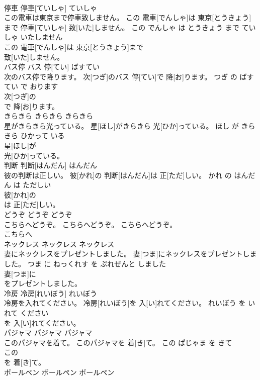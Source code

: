 \documentclass[8pt]{extreport}
\begin{document}
\begin{CJK}{UTF8}{min}
\\	停車	停車[ていしゃ]	ていしゃ	
\\	この電車は東京まで停車致しません。	この 電車[でんしゃ]は 東京[とうきょう]まで 停車[ていしゃ] 致[いた]しません。	この でんしゃ は とうきょう まで ていしゃ いたしません	
\\	この 電車[でんしゃ]は 東京[とうきょう]まで
\\	致[いた]しません。			
\\	バス停	バス 停[てい]	ばすてい	
\\	次のバス停で降ります。	次[つぎ]のバス 停[てい]で 降[お]ります。	つぎ の ばすてい で おります	
\\	次[つぎ]の
\\	で 降[お]ります。			
\\	きらきら	きらきら	きらきら	
\\	星がきらきら光っている。	星[ほし]がきらきら 光[ひか]っている。	ほし が きらきら ひかって いる	
\\	星[ほし]が
\\	光[ひか]っている。			
\\	判断	判断[はんだん]	はんだん	
\\	彼の判断は正しい。	彼[かれ]の 判断[はんだん]は 正[ただ]しい。	かれ の はんだん は ただしい	
\\	彼[かれ]の
\\	は 正[ただ]しい。			
\\	どうぞ	どうぞ	どうぞ	
\\	こちらへどうぞ。	こちらへどうぞ。	こちらへどうぞ。	
\\	こちらへ
\\	ネックレス	ネックレス	ネックレス	
\\	妻にネックレスをプレゼントしました。	妻[つま]にネックレスをプレゼントしました。	つま に ねっくれす を ぷれぜんと しました	
\\	妻[つま]に
\\	をプレゼントしました。			
\\	冷房	冷房[れいぼう]	れいぼう	
\\	冷房を入れてください。	冷房[れいぼう]を 入[い]れてください。	れいぼう を いれて ください	
\\	を 入[い]れてください。			
\\	パジャマ	パジャマ	パジャマ	
\\	このパジャマを着て。	このパジャマを 着[き]て。	この ぱじゃま を きて	
\\	この
\\	を 着[き]て。			
\\	ボールペン	ボールペン	ボールペン	

\end{CJK}
\end{document}
